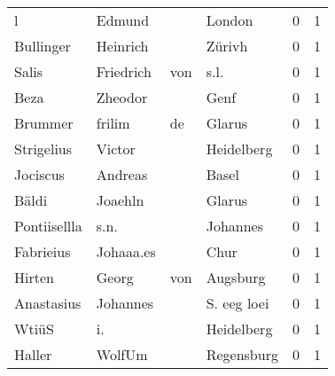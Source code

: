 \documentclass[10pt,a4paper,landscape]{article}
\begin{document}
\begin{longtable}{llllrr}
                        l &                             Edmund &             &                                      London &          0 &         1 \\
                Bullinger &                           Heinrich &             &                                      Zürivh &          0 &         1 \\
                    Salis &                          Friedrich &         von &                                        s.l. &          0 &         1 \\
                     Beza &                            Zheodor &             &                                        Genf &          0 &         1 \\
                  Brummer &                             frilim &          de &                                      Glarus &          0 &         1 \\
               Strigelius &                             Victor &             &                                  Heidelberg &          0 &         1 \\
                 Jociscus &                            Andreas &             &                                       Basel &          0 &         1 \\
                    Bäldi &                            Joaehln &             &                                      Glarus &          0 &         1 \\
             Pontiisellla &                               s.n. &             &                                    Johannes &          0 &         1 \\
                Fabrieius &                          Johaaa.es &             &                                        Chur &          0 &         1 \\
                   Hirten &                              Georg &         von &                                    Augsburg &          0 &         1 \\
               Anastasius &                           Johannes &             &                                 S. eeg loei &          0 &         1 \\
                    WtiüS &                                 i. &             &                                  Heidelberg &          0 &         1 \\
                   Haller &                             WolfUm &             &                                  Regensburg &          0 &         1 \\

\end{longtable}
\end{document}
